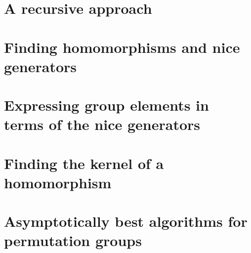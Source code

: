 \section{A recursive approach}
\label{recapproach}

\section{Finding homomorphisms and nice generators}
\label{findhom}

\section{Expressing group elements in terms of the nice generators}
\label{expressslp}

\section{Finding the kernel of a homomorphism}
\label{findkernel}

\section{Asymptotically best algorithms for permutation groups}
\label{permgrps}

